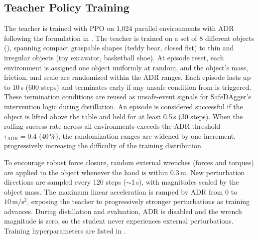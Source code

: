 \subsection{Teacher Policy Training}%
\label{sec:teacher_training_setup}%

The teacher is trained with \ac{PPO} on 1{,}024 parallel environments with \ac{ADR} following the formulation in .
The teacher is trained on a set of 8 different objects (), spanning compact graspable shapes (teddy bear, closed fist) to thin and irregular objects (toy excavator, basketball shoe).
At episode reset, each environment is assigned one object uniformly at random, and the object's mass, friction, and scale are randomized within the \ac{ADR} ranges.
Each episode lasts up to 10\,s (600 steps) and terminates early if any unsafe condition from  is triggered.
These termination conditions are reused as unsafe-event signals for SafeDAgger's intervention logic during distillation.
An episode is considered successful if the object is lifted above the table and held for at least 0.5\,s (30 steps).
When the rolling success rate across all environments exceeds the \ac{ADR} threshold $\tau_{\text{ADR}} = 0.4$ (40\,\%), the randomization ranges are widened by one increment, progressively increasing the difficulty of the training distribution.

To encourage robust force closure, random external wrenches (forces and torques) are applied to the object whenever the hand is within $0.3\,\mathrm{m}$.
New perturbation directions are sampled every 120 steps ($\sim$1\,s), with magnitudes scaled by the object mass.
The maximum linear acceleration is ramped by \ac{ADR} from $0$ to $10\,\mathrm{m/s^2}$, exposing the teacher to progressively stronger perturbations as training advances.
During distillation and evaluation, \ac{ADR} is disabled and the wrench magnitude is zero, so the student never experiences external perturbations.
Training hyperparameters are listed in .

